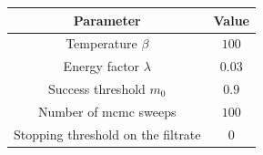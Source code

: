 \begin{tabular}{c c}
\toprule
Parameter                          & Value \\ \midrule
Temperature $\beta$                & $100$ \\
Energy factor $\lambda$            & $0.03$\\
Success threshold $m_0$            & $0.9$ \\
Number of \acrshort{mcmc} sweeps   & $100$ \\
Stopping threshold on the filtrate & $0$   \\
\bottomrule
\end{tabular}